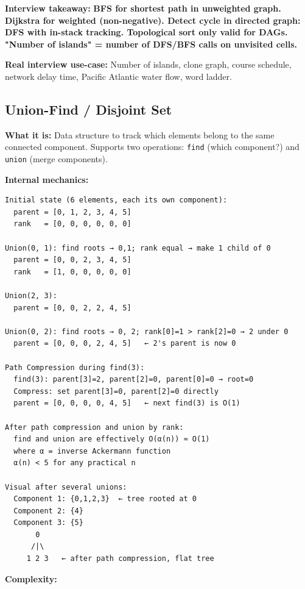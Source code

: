 \documentclass[11pt]{article}
\begin{document}
\textbf{Interview takeaway:} \textbf{BFS for shortest path in unweighted graph. Dijkstra for weighted (non-negative). Detect cycle in directed graph: DFS with in-stack tracking. Topological sort only valid for DAGs. "Number of islands" = number of DFS/BFS calls on unvisited cells.}

\textbf{Real interview use-case:} Number of islands, clone graph, course schedule, network delay time, Pacific Atlantic water flow, word ladder.

\subsection{Union-Find / Disjoint Set}\label{union-find--disjoint-set}

\textbf{What it is:} Data structure to track which elements belong to the same connected component. Supports two operations: \texttt{find} (which component?) and \texttt{union} (merge components).

\textbf{Internal mechanics:}

\setcodelang{}

\begin{verbatim}
Initial state (6 elements, each its own component):
  parent = [0, 1, 2, 3, 4, 5]
  rank   = [0, 0, 0, 0, 0, 0]

Union(0, 1): find roots → 0,1; rank equal → make 1 child of 0
  parent = [0, 0, 2, 3, 4, 5]
  rank   = [1, 0, 0, 0, 0, 0]

Union(2, 3):
  parent = [0, 0, 2, 2, 4, 5]

Union(0, 2): find roots → 0, 2; rank[0]=1 > rank[2]=0 → 2 under 0
  parent = [0, 0, 0, 2, 4, 5]   ← 2's parent is now 0

Path Compression during find(3):
  find(3): parent[3]=2, parent[2]=0, parent[0]=0 → root=0
  Compress: set parent[3]=0, parent[2]=0 directly
  parent = [0, 0, 0, 0, 4, 5]   ← next find(3) is O(1)

After path compression and union by rank:
  find and union are effectively O(α(n)) ≈ O(1)
  where α = inverse Ackermann function
  α(n) < 5 for any practical n

Visual after several unions:
  Component 1: {0,1,2,3}  ← tree rooted at 0
  Component 2: {4}
  Component 3: {5}
       0
      /|\
     1 2 3   ← after path compression, flat tree
\end{verbatim}

\textbf{Complexity:}
\end{document}
